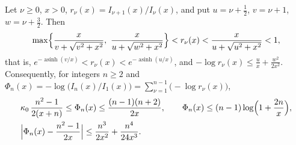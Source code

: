 \begin{lemma}\label{lem:bessel}
Let $\nu\ge0$, $x>0$, $r_\nu(x)=I_{\nu+1}(x)/I_\nu(x)$, and put
$u=\nu+\frac12$, $v=\nu+1$, $w=\nu+\frac32$. Then
\[
\max\Bigl\{\frac{x}{v+\sqrt{v^2+x^2}},\ \frac{x}{u+\sqrt{w^2+x^2}}\Bigr\}
<r_\nu(x)<\frac{x}{u+\sqrt{u^2+x^2}}<1,
\]
that is, $e^{-\operatorname{asinh}(v/x)}<r_\nu(x)<e^{-\operatorname{asinh}(u/x)}$,
and $-\log r_\nu(x)\le\frac ux+\frac{w^2}{2x^2}$. Consequently, for integers
$n\ge2$ and $\Phi_n(x)=-\log\bigl(I_n(x)/I_1(x)\bigr)=\sum_{\nu=1}^{n-1}
\bigl(-\log r_\nu(x)\bigr)$,
\begin{equation}\label{eq:besselratio}
\begin{aligned}
&\kappa_0\,\frac{n^2-1}{2(x+n)}\le\Phi_n(x)\le\frac{(n-1)(n+2)}{2x},\qquad
\Phi_n(x)\le(n-1)\log\Bigl(1+\frac{2n}x\Bigr),\\
&\Bigl|\Phi_n(x)-\frac{n^2-1}{2x}\Bigr|\le\frac{n^3}{2x^2}+\frac{n^4}{24x^3}.
\end{aligned}
\end{equation}
\end{lemma}

